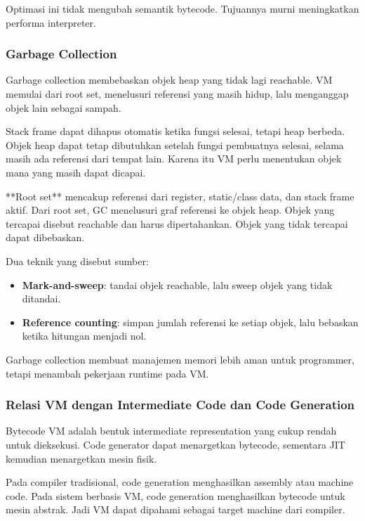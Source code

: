 Optimasi ini tidak mengubah semantik bytecode. Tujuannya murni meningkatkan performa interpreter.

\subsubsection{Garbage Collection}

\begin{jawab}
Garbage collection membebaskan objek heap yang tidak lagi reachable. VM memulai dari root set, menelusuri referensi yang masih hidup, lalu menganggap objek lain sebagai sampah.
\end{jawab}

Stack frame dapat dihapus otomatis ketika fungsi selesai, tetapi heap berbeda. Objek heap dapat tetap dibutuhkan setelah fungsi pembuatnya selesai, selama masih ada referensi dari tempat lain. Karena itu VM perlu menentukan objek mana yang masih dapat dicapai.

**Root set** mencakup referensi dari register, static/class data, dan stack frame aktif. Dari root set, GC menelusuri graf referensi ke objek heap. Objek yang tercapai disebut reachable dan harus dipertahankan. Objek yang tidak tercapai dapat dibebaskan.

Dua teknik yang disebut sumber:
\begin{itemize}
    \item \textbf{Mark-and-sweep}: tandai objek reachable, lalu sweep objek yang tidak ditandai.
    \item \textbf{Reference counting}: simpan jumlah referensi ke setiap objek, lalu bebaskan ketika hitungan menjadi nol.
\end{itemize}

Garbage collection membuat manajemen memori lebih aman untuk programmer, tetapi menambah pekerjaan runtime pada VM.

\subsubsection{Relasi VM dengan Intermediate Code dan Code Generation}

\begin{jawab}
Bytecode VM adalah bentuk intermediate representation yang cukup rendah untuk dieksekusi. Code generator dapat menargetkan bytecode, sementara JIT kemudian menargetkan mesin fisik.
\end{jawab}

Pada compiler tradisional, code generation menghasilkan assembly atau machine code. Pada sistem berbasis VM, code generation menghasilkan bytecode untuk mesin abstrak. Jadi VM dapat dipahami sebagai target machine dari compiler.

